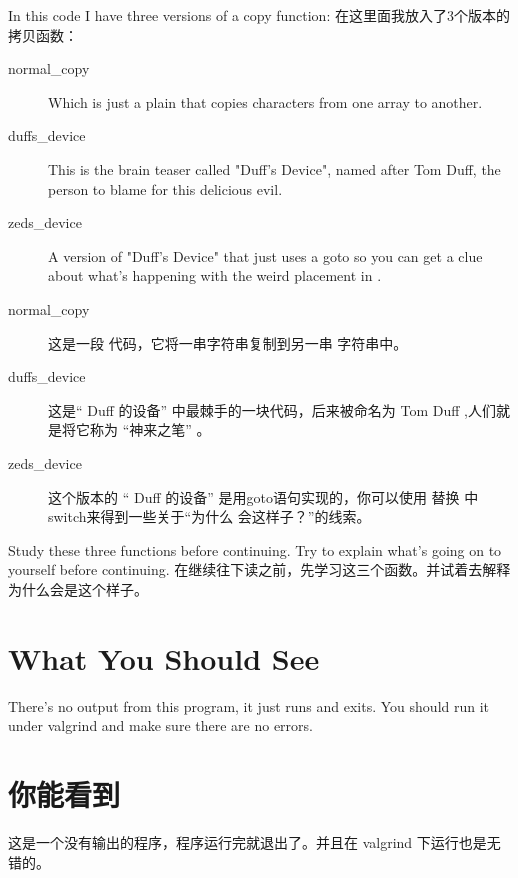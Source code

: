 In this code I have three versions of a copy function:
在这里面我放入了3个版本的拷贝函数：

\begin{description}
\item[normal\_copy] Which is just a plain  that copies
    characters from one array to another.

\item[duffs\_device] This is the brain teaser called "Duff's Device", named
    after Tom Duff, the person to blame for this delicious evil.

\item[zeds\_device] A version of "Duff's Device" that just uses a goto so
    you can get a clue about what's happening with the weird 
    placement in .
\end{description}

\begin{description}
\item[normal\_copy] 这是一段  代码，它将一串字符串复制到另一串
	字符串中。

\item[duffs\_device] 这是“ Duff 的设备” 中最棘手的一块代码，后来被命名为 Tom 
	 Duff ,人们就是将它称为 “神来之笔” 。

\item[zeds\_device] 这个版本的 “ Duff 的设备” 是用goto语句实现的，你可以使用
	 替换  中switch来得到一些关于“为什么
	会这样子？”的线索。
\end{description}

Study these three functions before continuing.  Try to explain what's
going on to yourself before continuing.
在继续往下读之前，先学习这三个函数。并试着去解释为什么会是这个样子。


\section{What You Should See}

There's no output from this program, it just runs and exits.  You should
run it under valgrind and make sure there are no errors.

\section{你能看到}
这是一个没有输出的程序，程序运行完就退出了。并且在 valgrind 下运行也是无
错的。

